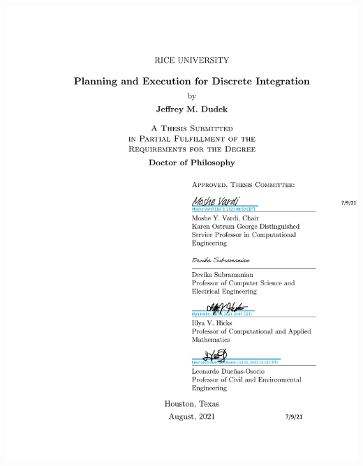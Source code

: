 \documentclass[12pt]{sty/ruthesis}
\begin{document}
\begin{frontmatter}
\begin{textblock}{80}
   	\includegraphics[page=1,clip,trim=110mm 58.7mm 10mm 210mm]{coverpage.pdf}
   \end{textblock}
   
   \maketitle
   
   
   \tableofcontents
   \listoffigures
   \listoftables
  \end{frontmatter}










\appendix

%
%
%
%



\end{document}

